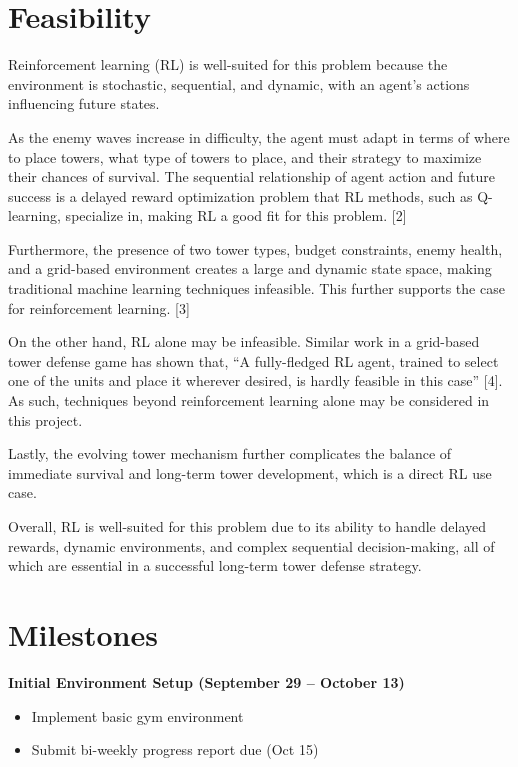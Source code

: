 \documentclass[12pt]{article}
\newcounter{ques}
\begin{document}
\section*{Feasibility}

Reinforcement learning (RL) is well-suited for this problem because the environment is stochastic, sequential, and dynamic, with an agent's actions influencing future states. \par 

As the enemy waves increase in difficulty, the agent must adapt in terms of where to place towers, what type of towers to place, and their strategy to maximize their chances of survival. The sequential relationship of agent action and future success is a delayed reward optimization problem that RL methods, such as Q-learning, specialize in, making RL a good fit for this problem. [2] \par

Furthermore, the presence of two tower types, budget constraints, enemy health, and a grid-based environment creates a large and dynamic state space, making traditional machine learning techniques infeasible. This further supports the case for reinforcement learning. [3] \par

On the other hand, RL alone may be infeasible. Similar work in a grid-based tower defense game has shown that, ``A fully-fledged RL agent, trained to select one of the units and place it wherever desired, is hardly feasible in this case'' [4]. As such, techniques beyond reinforcement learning alone may be considered in this project. \par

Lastly, the evolving tower mechanism further complicates the balance of immediate survival and long-term tower development, which is a direct RL use case. \par

Overall, RL is well-suited for this problem due to its ability to handle delayed rewards, dynamic environments, and complex sequential decision-making, all of which are essential in a successful long-term tower defense strategy.


\section*{Milestones}
\textbf{Initial Environment Setup (September 29 -- October 13)}
\begin{itemize}
    \item Implement basic gym environment
    \item Submit bi-weekly progress report due (Oct 15)
\end{itemize}
\end{document}
